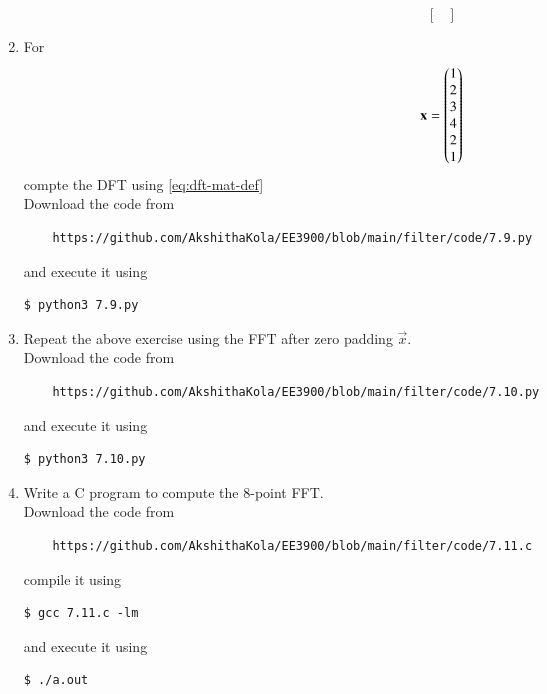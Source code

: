 \documentclass[journal,12pt,twocolumn]{IEEEtran}
\renewcommand\thesection{\arabic{section}}
\begin{document}
\begin{enumerate}[label=\arabic*.,ref=\thesection.\theenumi]
\begin{equation}
\begin{bmatrix}
\end{bmatrix}
\end{equation}
\item For 
    \begin{align}
	    \textbf{x} = \begin{pmatrix}1\\2\\3\\4\\2\\1\end{pmatrix}
        \label{eq:equation1}
    \end{align}
    compte the DFT  
		using 
	    \eqref{eq:dft-mat-def}\\
\solution Download the code from
\begin{lstlisting}
	https://github.com/AkshithaKola/EE3900/blob/main/filter/code/7.9.py
\end{lstlisting}
and execute it using
\begin{lstlisting}
$ python3 7.9.py
\end{lstlisting}
\item Repeat the above exercise using the FFT
after zero padding $\vec{x}$.\\
\solution Download the code from
\begin{lstlisting}
	https://github.com/AkshithaKola/EE3900/blob/main/filter/code/7.10.py
\end{lstlisting}
and execute it using
\begin{lstlisting}
$ python3 7.10.py
\end{lstlisting}
\item Write a C program to compute the 8-point FFT.\\
\solution Download the code from
\begin{lstlisting}
	https://github.com/AkshithaKola/EE3900/blob/main/filter/code/7.11.c
\end{lstlisting}
compile it using
\begin{lstlisting}
$ gcc 7.11.c -lm 
\end{lstlisting}
and execute it using
\begin{lstlisting}
$ ./a.out
\end{lstlisting}
 \end{enumerate}
\end{document}

